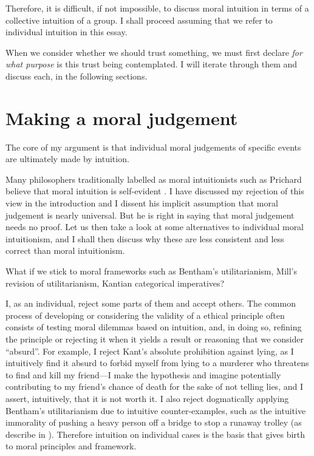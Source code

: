 \documentclass{scrartcl}
\begin{document}
Therefore, it is difficult, if not impossible, to discuss moral intuition in terms of a collective intuition of a group. I shall proceed assuming that we refer to individual intuition in this essay.

\bigskip

When we consider whether we should trust something, we must first declare \emph{for what purpose} is this trust being contemplated. I will iterate through them and discuss each, in the following sections.

\section{Making a moral judgement}

The core of my argument is that individual moral judgements of specific events are ultimately made by intuition.

Many philosophers traditionally labelled as moral intuitionists such as Prichard believe that moral intuition is self-evident \autocite{prichard}. I have discussed my rejection of this view in the introduction and I dissent his implicit assumption that moral judgement is nearly universal. But he is right in saying that moral judgement needs no proof. Let us then take a look at some alternatives to individual moral intuitionism, and I shall then discuss why these are less consistent and less correct than moral intuitionism.

What if we stick to moral frameworks such as Bentham's utilitarianism, Mill's revision of utilitarianism, Kantian categorical imperatives?

I, as an individual, reject some parts of them and accept others. The common process of developing or considering the validity of a ethical principle often consists of testing moral dilemmas based on intuition, and, in doing so, refining the principle or rejecting it when it yields a result or reasoning that we consider ``absurd''. For example, I reject Kant's absolute prohibition against lying, as I intuitively find it absurd to forbid myself from lying to a murderer who threatens to find and kill my friend---I make the hypothesis and imagine potentially contributing to my friend's chance of death for the sake of not telling lies, and I assert, intuitively, that it is not worth it. I also reject dogmatically applying Bentham's utilitarianism due to intuitive counter-examples, such as the intuitive immorality of pushing a heavy person off a bridge to stop a runaway trolley (as describe in \autocite[21]{justice}). Therefore intuition on individual cases is the basis that gives birth to moral principles and framework.
\end{document}
